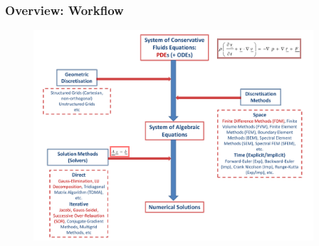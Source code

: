 \documentclass[10pt,compress]{beamer}
\begin{document}
\begin{frame}
 \frametitle{Overview: Workflow}

   \begin{figure}%
    \begin{center}
     \includegraphics[width=12.cm, height=7.8cm, clip]{./Figs/CFD_Schematics2.pdf}
    \end{center}
   \end{figure}    

\end{frame}
\end{document}
